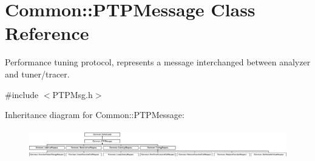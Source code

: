 \hypertarget{class_common_1_1_p_t_p_message}{\section{Common\-:\-:P\-T\-P\-Message Class Reference}
\label{class_common_1_1_p_t_p_message}
}


Performance tuning protocol, represents a message interchanged between analyzer and tuner/tracer.  




{\ttfamily \#include $<$P\-T\-P\-Msg.\-h$>$}

Inheritance diagram for Common\-:\-:P\-T\-P\-Message\-:\begin{figure}[H]
\begin{center}
\leavevmode
\includegraphics[height=1.295547cm]{class_common_1_1_p_t_p_message}
\end{center}
\end{figure}
